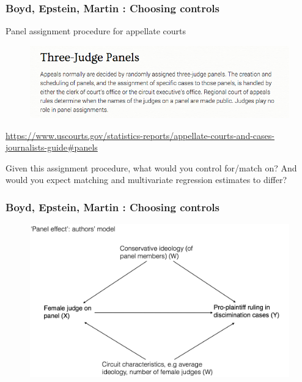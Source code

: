 \documentclass[12pt,english,dvipsnames,aspectratio=169,handout]{beamer}\usepackage[]{graphicx}\usepackage[]{xcolor}
\begin{document}
\begin{frame}
	\frametitle{Boyd, Epstein, Martin \citeyear{boyd_untangling_2010}: Choosing controls}
	\footnotesize
  Panel assignment procedure for appellate courts
  	 \begin{figure} 
    \includegraphics[height=.4\textheight,keepaspectratio=true]{../04-figures/06/07-w6_three_judge}
    \end{figure}
    \tiny
    \url{https://www.uscourts.gov/statistics-reports/appellate-courts-and-cases-journalists-guide\#panels}
    
    \footnotesize
    Given this assignment procedure, what would you control for/match on? And would you expect matching and multivariate regression estimates to differ? 
\end{frame}


\begin{frame}
	\frametitle{Boyd, Epstein, Martin \citeyear{boyd_untangling_2010}: Choosing controls}
	\footnotesize
  	 \begin{figure} 
    \includegraphics[height=.8\textheight,keepaspectratio=true]{../04-figures/06/08-w6_dag_full}
    \end{figure}
\end{frame}
\end{document}
